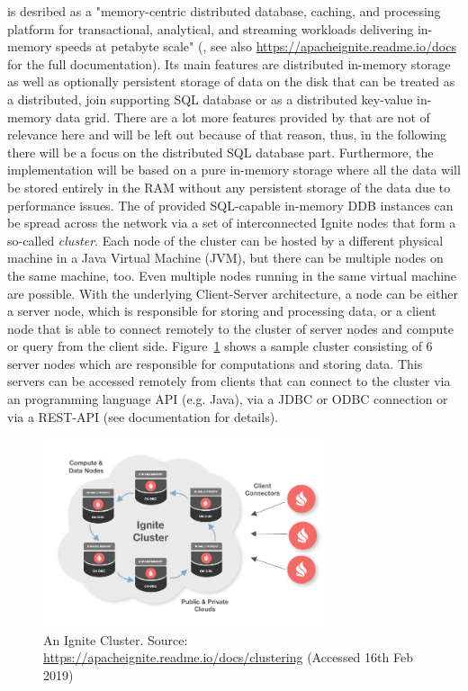  is desribed as a "memory-centric distributed database, caching, and processing platform for transactional, analytical, and streaming
workloads delivering in-memory speeds at petabyte scale" (, see also \url{https://apacheignite.readme.io/docs} for the full
documentation).
Its main features are distributed in-memory storage as well as optionally persistent storage of data on the disk that can be treated as a distributed, join
supporting SQL database or as a distributed key-value in-memory data grid. There are a lot more features provided by  that are not of
relevance here and will be left out because of that reason, thus, in the following there will be a focus on the distributed SQL database part.
Furthermore, the implementation will be based on a pure in-memory storage where all the data will be stored entirely in the RAM without any persistent 
storage of the data due to performance issues. The of  provided SQL-capable in-memory DDB instances can be spread across the network 
via a set of interconnected Ignite nodes that form a so-called \emph{cluster}. Each node of the cluster can be hosted by a different physical machine 
in a Java Virtual Machine (JVM), but there can be multiple nodes on the same machine, too. Even multiple nodes running in the same virtual machine are
possible. With the underlying Client-Server architecture, a node can be either a server node, which is responsible for storing and processing data, or a
client node that is able to connect remotely to the cluster of server nodes and compute or query from the client side. Figure~\ref{fig:ign_cluster} shows
a sample cluster consisting of 6 server nodes which are responsible for computations and storing data. This servers can be accessed remotely from clients
that can connect to the cluster via an programming language API (e.g. Java), via a JDBC or ODBC connection or via a REST-API (see documentation for
details). 

\begin{figure}[h]
    \centering
    \includegraphics[width=0.75\textwidth,keepaspectratio=true]{img/9287d3c-ignite-deploy.png}
    \caption{An Ignite Cluster. Source: \protect\url{https://apacheignite.readme.io/docs/clustering} (Accessed 16th Feb 2019)}
    \label{fig:ign_cluster}
\end{figure}


